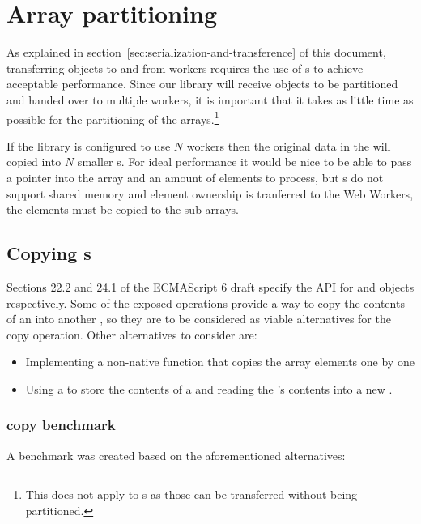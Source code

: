 \section{Array partitioning}

As explained in section~\ref{sec:serialization-and-transference} of this document, transferring \ttarray{} objects to and from workers requires the use of s to achieve acceptable performance. Since our library will receive \ttarray{} objects to be partitioned and handed over to multiple workers, it is important that it takes as little time as possible for the partitioning of the arrays.\footnote{This does not apply to \tstarray{}s as those can be transferred without being partitioned.}

If the library is configured to use \(N\) workers then the original data in the \ttarray{} will copied into \(N\) smaller \ttarray{}s. For ideal performance it would be nice to be able to pass a pointer into the array and an amount of elements to process, but \ttarray{}s do not support shared memory and element ownership is tranferred to the Web Workers, the elements must be copied to the sub-arrays.

\subsection{Copying \ttarray{}s}
\label{subsec:copying-typed-arrays}
Sections 22.2 and 24.1 of the ECMAScript 6 draft \cite{es6} specify the API for \ttarray{} and \tabuffer{} objects respectively. Some of the exposed operations provide a way to copy the contents of an \tabuffer{} into another \tabuffer{}, so they are to be considered as viable alternatives for the copy operation. Other alternatives to consider are:
\begin{itemize}
  \item Implementing a non-native function that copies the array elements one by one
  \item Using a  to store the contents of a \ttarray{} and reading the 's contents into a new \ttarray{}.
\end{itemize}

\subsubsection{\ttarray{} copy benchmark}
A benchmark was created based on the aforementioned alternatives:

